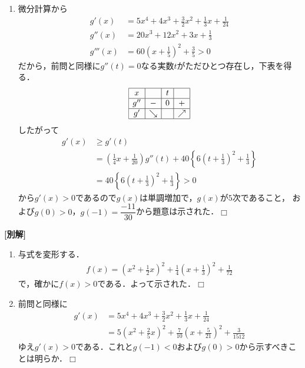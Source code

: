 \documentclass[a4j]{jarticle}
\begin{document}
\begin{multicols}{2}
\begin{enumerate}[(1)]
      \item 微分計算から
           \begin{align*}
           g'(x)&=5x^4+4x^3+\frac{3}{2}x^2+\frac{1}{3}x+\frac{1}{24} \\
           g''(x)&=20x^3+12x^2+3x+\frac{1}{3}  \\
           g'''(x)&=60\left(x+\frac{1}{5}\right)^2+\frac{3}{5}>0
           \end{align*}
      だから，前問と同様に$g''(t)=0$なる実数$t$がただひとつ存在し，下表を得る．    
           \begin{align*}
                \begin{array}{|c|c|c|c|} \hline
                x     &      &    t       &        \\ \hline
                g''    &  -  &   0       &  +   \\ \hline
                g'    &\searrow&             &  \nearrow \\ \hline
               \end{array}
          \end{align*}
      したがって
           \begin{align*}
           g'(x)&\ge g'(t) \\
           &=\left(\frac{1}{4}x+\frac{1}{20}\right)g''(t)+%
           40\left\{6\left(t+\frac{1}{3}\right)^2+\frac{1}{3}\right\} \\
           &=40\left\{6\left(t+\frac{1}{3}\right)^2+\frac{1}{3}\right\}>0
           \end{align*}  
      から$g'(x)>0$であるので$g(x)$は単調増加で，$g(x)$が$5$次であること，
      および$g(0)>0$，$g(-1)=\dfrac{-11}{30}$から題意は示された．$\Box$     
      \end{enumerate}
{\bf[別解]}
     \begin{enumerate}[(1)]
     \item 与式を変形する．
          \begin{align*}
          f(x)=\left(x^2+\frac{1}{2}x\right)^2+\frac{1}{4}\left(x+\frac{1}{3}\right)^2+\frac{1}{72}
          \end{align*}
     で，確かに$f(x)>0$である．よって示された．$\Box$
     
     \item 前問と同様に
          \begin{align*}
          g'(x)&=5x^4+4x^3+\frac{3}{2}x^2+\frac{1}{3}x+\frac{1}{24}     \\
          &=5(x^2+\frac{2}{5}x)^2+\frac{7}{10}(x+\frac{5}{21})^2+\frac{3}{1512} 
          \end{align*}
     ゆえ$g'(x)>0$である．これと$g(-1)<0$および$g(0)>0$から示すべきことは明らか．$\Box$     
     \end{enumerate}      
\newpage
\end{multicols}
\end{document}
